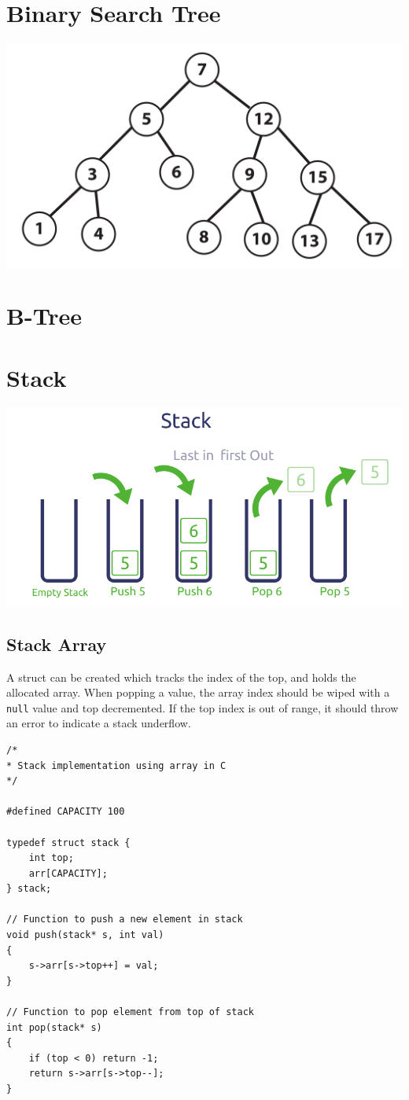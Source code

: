 \documentclass[11pt]{article}
\begin{document}
\section{Binary Search Tree}
\begin{center}
    \includegraphics[width=250 px]{img/binarysearchtree}  \\
\end{center}
\section{B-Tree}

\section{Stack}
\begin{center}
    \includegraphics[width=250 px]{img/stack}  \\
\end{center}

\subsection{Stack Array}

A struct can be created which tracks the index of the top, and holds the allocated array. When popping a value, the array index should be wiped with a \texttt{null} value and top decremented. If the top index is out of range, it should throw an error to indicate a stack underflow.

\begin{lstlisting}
/*
* Stack implementation using array in C
*/

#defined CAPACITY 100

typedef struct stack {
    int top;
    arr[CAPACITY];
} stack;

// Function to push a new element in stack
void push(stack* s, int val)
{
    s->arr[s->top++] = val;
}

// Function to pop element from top of stack
int pop(stack* s)
{    
    if (top < 0) return -1;
    return s->arr[s->top--];
}
\end{lstlisting}
\end{document}
